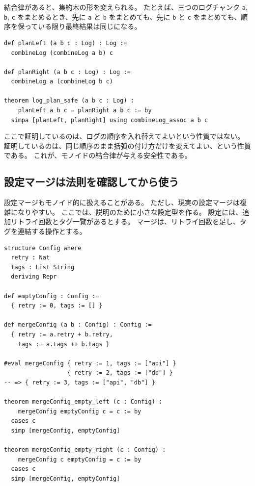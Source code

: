 \begin{softwarebox}
結合律があると、集約木の形を変えられる。
たとえば、三つのログチャンク \texttt{a}, \texttt{b}, \texttt{c} をまとめるとき、先に \texttt{a} と \texttt{b} をまとめても、先に \texttt{b} と \texttt{c} をまとめても、順序を保っている限り最終結果は同じになる。
\end{softwarebox}

\begin{listing}[htbp]
\begin{verbatim}
def planLeft (a b c : Log) : Log :=
  combineLog (combineLog a b) c

def planRight (a b c : Log) : Log :=
  combineLog a (combineLog b c)

theorem log_plan_safe (a b c : Log) :
    planLeft a b c = planRight a b c := by
  simpa [planLeft, planRight] using combineLog_assoc a b c
\end{verbatim}
\caption{三つのログチャンクの集約計画は括弧に依存しない}
\label{lst:ch10_log_plan}
\end{listing}

ここで証明しているのは、ログの順序を入れ替えてよいという性質ではない。
証明しているのは、同じ順序のまま括弧の付け方だけを変えてよい、という性質である。
これが、モノイドの結合律が与える安全性である。

\subsection{設定マージは法則を確認してから使う}

設定マージもモノイド的に扱えることがある。
ただし、現実の設定マージは複雑になりやすい。
ここでは、説明のために小さな設定型を作る。
設定には、追加リトライ回数とタグ一覧があるとする。
マージは、リトライ回数を足し、タグを連結する操作とする。

\begin{listing}[htbp]
\begin{verbatim}
structure Config where
  retry : Nat
  tags : List String
  deriving Repr

def emptyConfig : Config :=
  { retry := 0, tags := [] }

def mergeConfig (a b : Config) : Config :=
  { retry := a.retry + b.retry,
    tags := a.tags ++ b.tags }

#eval mergeConfig { retry := 1, tags := ["api"] }
                  { retry := 2, tags := ["db"] }
-- => { retry := 3, tags := ["api", "db"] }

theorem mergeConfig_empty_left (c : Config) :
    mergeConfig emptyConfig c = c := by
  cases c
  simp [mergeConfig, emptyConfig]

theorem mergeConfig_empty_right (c : Config) :
    mergeConfig c emptyConfig = c := by
  cases c
  simp [mergeConfig, emptyConfig]
\end{verbatim}
\caption{設定マージの小さなモデル}
\label{lst:ch10_config_merge}
\end{listing}

